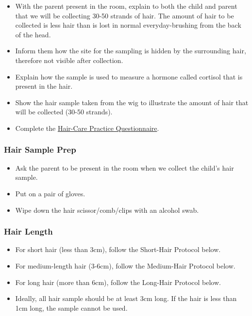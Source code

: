 \documentclass[]{book}
\providecommand{\tightlist}{%
  \setlength{\itemsep}{0pt}\setlength{\parskip}{0pt}}
\begin{document}
\begin{itemize}
\tightlist
\item
  With the parent present in the room, explain to both the child and parent that we will be collecting 30-50 strands of hair. The amount of hair to be collected is less hair than is lost in normal everyday-brushing from the back of the head.
\item
  Inform them how the site for the sampling is hidden by the surrounding hair, therefore not visible after collection.
\item
  Explain how the sample is used to measure a hormone called cortisol that is present in the hair.
\item
  Show the hair sample taken from the wig to illustrate the amount of hair that will be collected (30-50 strands).
\item
  Complete the \href{https://app.box.com/file/630323877918}{Hair-Care Practice Questionnaire}.
\end{itemize}

\hypertarget{hair-sample-prep}{%
\subsubsection{Hair Sample Prep}\label{hair-sample-prep}}

\begin{itemize}
\tightlist
\item
  Ask the parent to be present in the room when we collect the child's hair sample.
\item
  Put on a pair of gloves.
\item
  Wipe down the hair scissor/comb/clips with an alcohol swab.
\end{itemize}

\hypertarget{hair-length}{%
\subsubsection{Hair Length}\label{hair-length}}

\begin{itemize}
\tightlist
\item
  For short hair (less than 3cm), follow the Short-Hair Protocol below.
\item
  For medium-length hair (3-6cm), follow the Medium-Hair Protocol below.
\item
  For long hair (more than 6cm), follow the Long-Hair Protocol below.
\item
  Ideally, all hair sample should be at least 3cm long. If the hair is less than 1cm long, the sample cannot be used.
\end{itemize}
\end{document}
